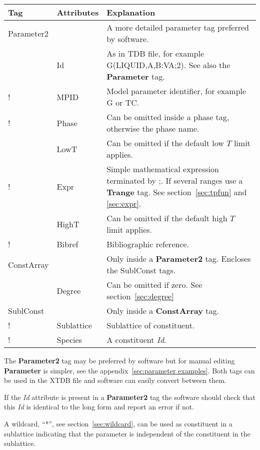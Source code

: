 \documentclass{article}
\begin{document}
\bigskip
\begin{tabular}{|p{} p{} p{}|}\hline
  Tag & Attributes &  Explanation\\\hline

  Parameter2 & & A more detailed parameter tag preferred by software.\\
      & Id & As in TDB file, for example G(LIQUID,A,B:VA;2).  See also the {\bf Parameter} tag. \\
!      & MPID & Model parameter identifier, for example G or TC.\\
!      & Phase &  Can be omitted inside a phase tag, otherwise the phase name.\\
      & LowT & Can be omitted if the default low $T$ limit applies.\\
!      & Expr & Simple mathematical expression terminated by ;.  If several ranges use a {\bf Trange} tag.  See section~\ref{sec:tpfun} and \ref{sec:expr}.\\
      & HighT & Can be omitted if the default high $T$ limit applies.\\
!      & Bibref & Bibliographic reference.\\\hline

  ConstArray & & Only inside a {\bf Parameter2} tag.  Encloses the
                   SublConst tags.\\
      & Degree & Can be omitted if zero.  See section~\ref{sec:degree}\\\hline
  
  SublConst & & Only inside a {\bf ConstArray} tag. \\
!      & Sublattice &  Sublattice of constituent.\\
!      & Species & A constituent {\em Id}.\\\hline  
\end{tabular}

\bigskip
The {\bf Parameter2} tag may be preferred by software but for
manual editing {\bf Parameter} is simpler, see the
appendix~\ref{sec:parameter examples}.  Both tags can be used in
the XTDB file and software can easily convert between them.

If the {\em Id} attribute is present in a {\bf Parameter2} tag the
software should check that this {\em Id} is identical to the long form
and report an error if not.

A wildcard, ``*'', see section~\ref{sec:wildcard}, can be used as
constituent in a sublattice indicating that the parameter is
independent of the constituent in the sublattice.
\end{document}
